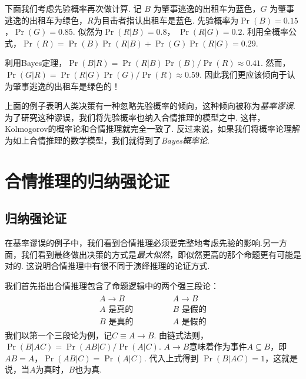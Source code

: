 下面我们考虑先验概率再次做计算. 记 $B$ 为肇事逃逸的出租车为蓝色，$G$ 为肇事逃逸的出租车为绿色，$R$为目击者指认出租车是蓝色. 先验概率为$\Pr(B) = 0.15$，$\Pr(G) = 0.85$. 似然为$\Pr(R|B) = 0.8$， $\Pr(R|G) = 0.2$. 利用全概率公式，$\Pr(R) = \Pr(B)\Pr(R|B) + \Pr(G)\Pr(R|G)  =0.29$. 

利用Bayes定理，$\Pr(B|R) = \Pr(R|B){\Pr(B)}/{\Pr(R)}\approx 0.41$. 然而，$\Pr(G|R) = \Pr(R|G){\Pr(G)}/{\Pr(R)}\approx 0.59$. 因此我们更应该倾向于认为肇事逃逸的出租车是绿色的！

上面的例子表明人类决策有一种忽略先验概率的倾向，这种倾向被称为\emph{基率谬误}. 为了研究这种谬误，我们将先验概率也纳入合情推理的模型之中. 这样，Kolmogorov的概率论和合情推理就完全一致了. 反过来说，如果我们将概率论理解为如上合情推理的数学模型，我们就得到了\emph{Bayes概率论}.

\section{合情推理的归纳强论证}

\subsection{归纳强论证}

在基率谬误的例子中，我们看到合情推理必须要完整地考虑先验的影响.另一方面，我们看到最终做出决策的方式是\emph{最大似然}，即似然更高的那个命题更有可能是对的. 这说明合情推理中有很不同于演绎推理的论证方式.

我们首先指出合情推理包含了命题逻辑中的两个强三段论：
        \[
        \begin{array}{c}
            \begin{array}{c}  
                A \to B \\ A\text{ 是真的} \\ \hline B\text{ 是真的}
            \end{array} 
            \qquad \qquad 
            \begin{array}{c}  
                A \to B \\ B\text{ 是假的} \\ \hline A\text{ 是假的}
            \end{array}
        \end{array} 
    \]
我们以第一个三段论为例，记$C \equiv A \to B$. 由链式法则，$\Pr(B|AC) = \Pr(AB|C) / \Pr(A|C)$. $A \to B$意味着作为事件$A\subseteq B$，即$AB=A$，$\Pr(AB|C) = \Pr(A|C)$. 代入上式得到 $\Pr(B|AC) = 1$，这就是说，当$A$为真时，$B$也为真.

